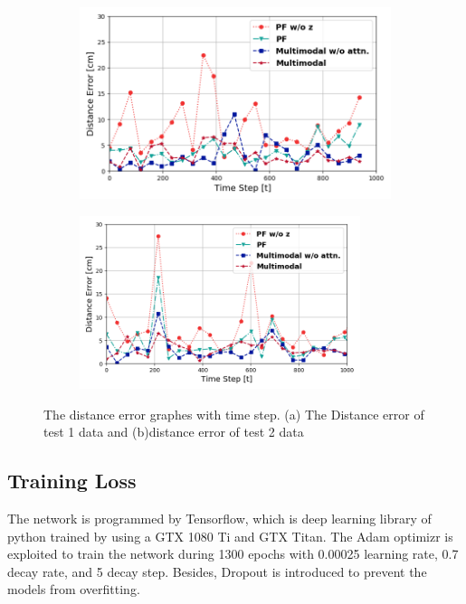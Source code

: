 \documentclass[letterpaper, 10 pt, conference]{ieeeconf}  %
\begin{document}
\begin{figure}[h]
	\centering
	\begin{subfigure}[b]{.50\textwidth}
		\centering
		\includegraphics[width=.9\textwidth]{1103_Karpe_Distance_error_result__test1}
		\label{fig:error1} 	
		\caption{}
	\end{subfigure}%
	\begin{subfigure}[b]{.50\textwidth}
		\centering
		\includegraphics[width=0.9\textwidth]{1103_Karpe_Distance_error_result__test3}
		\label{fig:error2} 	
		\caption{}
	\end{subfigure}
	\caption{The distance error graphes with time step. (a) The Distance error of test 1 data  and (b)distance error of test 2 data}
	\label{fig:error}
\end{figure} 

\subsection{Training Loss}
The network is programmed by Tensorflow, which is deep learning library of python trained by using a GTX 1080 Ti and GTX Titan. The Adam optimizr is exploited to train the network during 1300 epochs with 0.00025 learning rate, 0.7 decay rate, and 5 decay step. Besides, Dropout is introduced to prevent the models from overfitting. 
\end{document}
